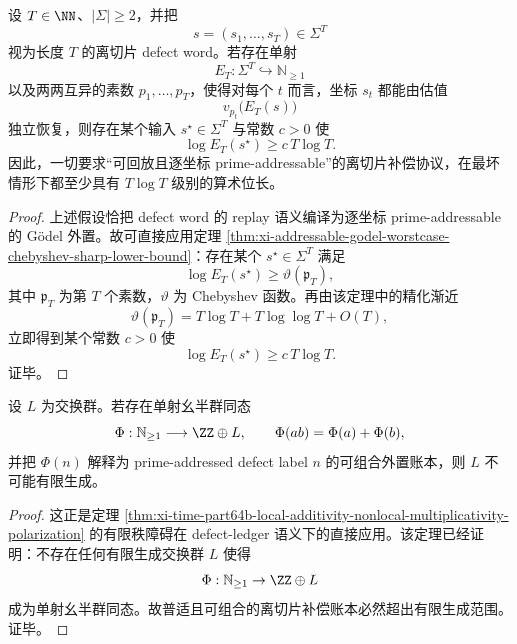 \begin{theorem}\label{thm:xi-time-part9v-replayable-offslice-godel-bitlength-lower-bound}
设 \(T\in\NN\)、\(|\Sigma|\ge 2\)，并把
\[
s=(s_1,\dots,s_T)\in\Sigma^T
\]
视为长度 \(T\) 的离切片 defect word。若存在单射
\[
E_T:\Sigma^T\hookrightarrow \mathbb N_{\ge 1}
\]
以及两两互异的素数 \(p_1,\dots,p_T\)，使得对每个 \(t\) 而言，坐标 \(s_t\) 都能由估值
\[
v_{p_t}\!\bigl(E_T(s)\bigr)
\]
独立恢复，则存在某个输入 \(s^\star\in\Sigma^T\) 与常数 \(c>0\) 使
\[
\log E_T(s^\star)\ge c\,T\log T.
\]
因此，一切要求“可回放且逐坐标 prime-addressable”的离切片补偿协议，在最坏情形下都至少具有 \(T\log T\) 级别的算术位长。
\end{theorem}
\begin{proof}
上述假设恰把 defect word 的 replay 语义编译为逐坐标 prime-addressable 的 Gödel 外置。故可直接应用定理 \ref{thm:xi-addressable-godel-worstcase-chebyshev-sharp-lower-bound}：存在某个 \(s^\star\in\Sigma^T\) 满足
\[
\log E_T(s^\star)\ge \vartheta(\mathfrak p_T),
\]
其中 \(\mathfrak p_T\) 为第 \(T\) 个素数，\(\vartheta\) 为 Chebyshev 函数。再由该定理中的精化渐近
\[
\vartheta(\mathfrak p_T)=T\log T+T\log\log T+O(T),
\]
立即得到某个常数 \(c>0\) 使
\[
\log E_T(s^\star)\ge c\,T\log T.
\]
证毕。
\end{proof}

\begin{theorem}[普适离切片补偿账本的有限生成不可能性]\label{thm:xi-time-part9v-universal-offslice-ledger-not-finitely-generated}
设 \(L\) 为交换群。若存在单射幺半群同态
\[
\Phi:\mathbb N_{\ge 1}\longrightarrow \ZZ\oplus L,
\qquad
\Phi(ab)=\Phi(a)+\Phi(b),
\]
并把 \(\Phi(n)\) 解释为 prime-addressed defect label \(n\) 的可组合外置账本，则 \(L\) 不可能有限生成。
\end{theorem}
\begin{proof}
这正是定理 \ref{thm:xi-time-part64b-local-additivity-nonlocal-multiplicativity-polarization} 的有限秩障碍在 defect-ledger 语义下的直接应用。该定理已经证明：不存在任何有限生成交换群 \(L\) 使得
\[
\Phi:\mathbb N_{\ge 1}\to \ZZ\oplus L
\]
成为单射幺半群同态。故普适且可组合的离切片补偿账本必然超出有限生成范围。证毕。
\end{proof}

